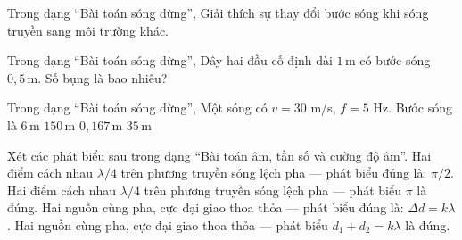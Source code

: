 \begin{ex}
Trong dạng “Bài toán sóng dừng”, Giải thích sự thay đổi bước sóng khi sóng truyền sang môi trường khác.
\choiceTF

\end{ex}

\begin{ex}
Trong dạng “Bài toán sóng dừng”, Dây hai đầu cố định dài $1\,\text{m}$ có bước sóng $0,5\,\text{m}$. Số bụng là bao nhiêu?
\end{ex}

\begin{ex}
Trong dạng “Bài toán sóng dừng”, Một sóng có $v=30$ m/s, $f=5$ Hz. Bước sóng là
\choice
{\True $6\,\text{m}$}
{$150\,\text{m}$}
{$0,167\,\text{m}$}
{$35\,\text{m}$}
\end{ex}

\begin{ex}
Xét các phát biểu sau trong dạng “Bài toán âm, tần số và cường độ âm”.
\choiceTF
{\True Hai điểm cách nhau $\lambda/4$ trên phương truyền sóng lệch pha — phát biểu đúng là: $\pi/2$.}
{Hai điểm cách nhau $\lambda/4$ trên phương truyền sóng lệch pha — phát biểu $\pi$ là đúng.}
{\True Hai nguồn cùng pha, cực đại giao thoa thỏa — phát biểu đúng là: $\Delta d=k\lambda$.}
{Hai nguồn cùng pha, cực đại giao thoa thỏa — phát biểu $d_1+d_2=k\lambda$ là đúng.}
\end{ex}

